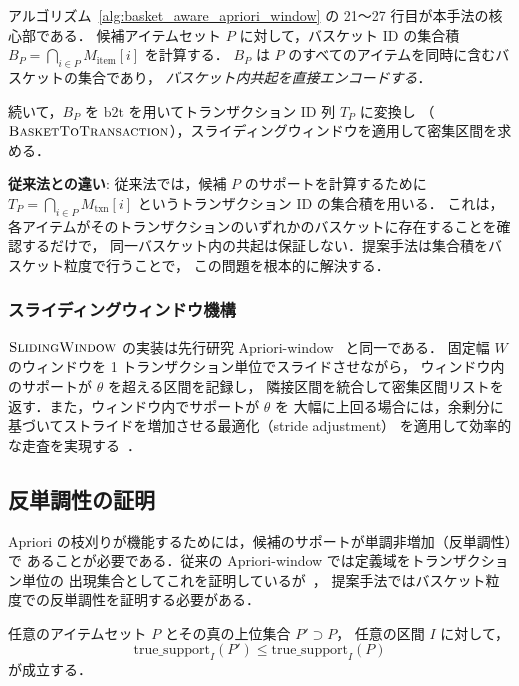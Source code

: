 アルゴリズム~\ref{alg:basket_aware_apriori_window} の 21〜27 行目が本手法の核心部である．
候補アイテムセット $P$ に対して，バスケット ID の集合積
$B_P = \bigcap_{i \in P} M_{\text{item}}[i]$ を計算する．
$B_P$ は $P$ のすべてのアイテムを同時に含むバスケットの集合であり，
\emph{バスケット内共起を直接エンコードする}．

続いて，$B_P$ を $\text{b2t}$ を用いてトランザクション ID 列 $T_P$ に変換し
（$\Call{BasketToTransaction}{}$），スライディングウィンドウを適用して密集区間を求める．

\textbf{従来法との違い}: 従来法では，候補 $P$ のサポートを計算するために
$T_P = \bigcap_{i \in P} M_{\text{txn}}[i]$ というトランザクション ID の集合積を用いる．
これは，各アイテムがそのトランザクションのいずれかのバスケットに存在することを確認するだけで，
同一バスケット内の共起は保証しない．提案手法は集合積をバスケット粒度で行うことで，
この問題を根本的に解決する．

\subsubsection{スライディングウィンドウ機構}

$\Call{SlidingWindow}{}$ の実装は先行研究 Apriori-window~\cite{dsaa2025} と同一である．
固定幅 $W$ のウィンドウを 1 トランザクション単位でスライドさせながら，
ウィンドウ内のサポートが $\theta$ を超える区間を記録し，
隣接区間を統合して密集区間リストを返す．また，ウィンドウ内でサポートが $\theta$ を
大幅に上回る場合には，余剰分に基づいてストライドを増加させる最適化（stride adjustment）
を適用して効率的な走査を実現する~\cite{dsaa2025}．

\subsection{反単調性の証明}
\label{sec:anti_monotone}

Apriori の枝刈りが機能するためには，候補のサポートが単調非増加（反単調性）で
あることが必要である．従来の Apriori-window では定義域をトランザクション単位の
出現集合としてこれを証明しているが~\cite{dsaa2025}，
提案手法ではバスケット粒度での反単調性を証明する必要がある．

\begin{theorem}[バスケット内共起における反単調性]
\label{thm:anti_monotone}
任意のアイテムセット $P$ とその真の上位集合 $P' \supset P$，
任意の区間 $I$ に対して，
\begin{equation}
\text{true\_support}_I(P') \leq \text{true\_support}_I(P)
\label{eq:anti_monotone}
\end{equation}
が成立する．
\end{theorem}

